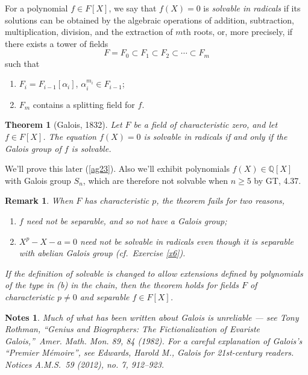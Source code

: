 \documentclass[a4paper,11pt,final,openany]{memoir}
\newtheorem{theorem}[X]{Theorem}
\newtheorem{remark}[X]{Remark}
\newtheorem*{nt}{Notes}
\theoremstyle{nonumberplain}
\begin{document}
For a polynomial $f\in F[X]$, we say that $f(X)=0$ is \emph{solvable in
radicals }%
%
if its solutions can be obtained by the algebraic operations of addition,
subtraction, multiplication, division, and the extraction of $m$th roots, or,
more precisely, if there exists a tower of fields%
\[
F=F_{0}\subset F_{1}\subset F_{2}\subset\cdots\subset F_{m}%
\]
such that

\begin{enumerate}
\item $F_{i}=F_{i-1}[\alpha_{i}]$, $\alpha_{i}^{m_{i}}\in F_{i-1}$;

\item $F_{m}$ contains a splitting field for $f.$
\end{enumerate}

\begin{theorem}
[Galois, 1832]\label{ft25}%
%
Let $F$ be a field of characteristic zero, and let $f\in F[X]$. The equation
$f(X)=0$ is solvable in radicals if and only if the Galois group of $f$ is solvable.
\end{theorem}

We'll prove this later (\ref{ag23}). Also we'll exhibit polynomials
$f(X)\in\mathbb{Q}[X]$ with Galois group $S_{n}$, which are therefore not
solvable when $n\geq5$ by GT, 4.37.

\begin{remark}
\label{ft26}When $F$ has characteristic $p$, the theorem fails for two reasons,

\begin{enumerate}
\item $f$ need not be separable, and so not have a Galois group;

\item $X^{p}-X-a=0$ need not be solvable in radicals even though it is
separable with abelian Galois group (cf.\ Exercise \ref{x6}).
\end{enumerate}

\noindent If the definition of solvable is changed to allow extensions defined
by polynomials of the type in (b) in the chain, then the theorem holds for
fields $F$ of characteristic $p\neq0$ and separable $f\in F[X]$.
\end{remark}

\begin{nt}
Much of what has been written about Galois is unreliable --- see Tony Rothman,
\textquotedblleft Genius and Biographers: The Fictionalization of Evariste
Galois,\textquotedblright\ Amer. Math. Mon. 89, 84 (1982). For a careful
explanation of Galois's \textquotedblleft Premier
M\'{e}moire\textquotedblright, see Edwards, Harold M., Galois for 21st-century
readers. Notices A.M.S.~59 (2012), no. 7, 912--923.
\end{nt}
\end{document}
